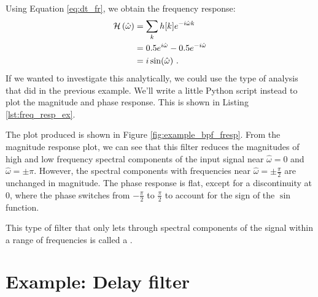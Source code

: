 Using Equation \ref{eq:dt_fr}, we obtain the frequency response:
\begin{align}
\mathcal{H}\left(\hat{\omega}\right) & = \sum_k h[k] e^{-i\hat{\omega}k}\\
    & = 0.5e^{i\hat{\omega}} -  0.5e^{-i\hat{\omega}} \\
    &= i \sin(\hat{\omega}) \,\,.
\end{align}
If we wanted to investigate this analytically, we could use the type
of analysis that did in the previous example. We'll write a little
Python script instead to plot the magnitude and phase response. This is shown in Listing \ref{lst:freq_resp_ex}.

The plot produced is shown in Figure \ref{fig:example_bpf_fresp}. From
the magnitude response plot, we can see that this filter reduces the
magnitudes of high and low frequency spectral components of the input
signal near $\hat{\omega}=0$ and $\hat{\omega}=\pm \pi$. However, the
spectral components with frequencies near
$\hat{\omega}=\pm \frac{\pi}{2}$ are unchanged in magnitude. The phase
response is flat, except for a discontinuity at 0, where
the phase switches from $-\frac{\pi}{2}$ to $\frac{\pi}{2}$ to account
for the sign of the $\sin$ function.

This type of filter that only lets through spectral components of
the signal within a range of frequencies is called a \emph{}. 



\section{Example: Delay filter}

